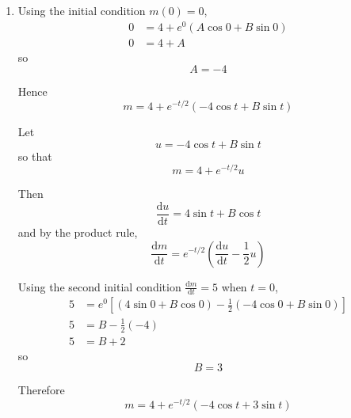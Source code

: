 \documentclass[leqno]{article}
\begin{document}
\begin{enumerate}[
  label=\textbf{\arabic*.},
  leftmargin=*,
  topsep=0pt,
  partopsep=0pt,
  parsep=0pt
]
\begin{tcolorbox}[colback=white, colframe=scarlet, title={\textbf{Solution}}, breakable, grow to left by=6mm, grow to right by=10mm]
\begin{enumerate}[label=\textbf{(\alph*)}]
  Its auxiliary equation is
  \[
  4\lambda^2+4\lambda+5=0
  \]

  Using the quadratic formula,
  \begin{align*}
  \lambda&=\frac{-4\pm\sqrt{4^2-4(4)(5)}}{2(4)}\\
  &=\frac{-4\pm\sqrt{16-80}}{8}\\
  &=\frac{-4\pm\sqrt{-64}}{8}\\
  &=\frac{-4\pm 8\mathrm{i}}{8}\\
  &=-\frac12\pm \mathrm{i}
  \end{align*}

  So the complementary function is
  \[
  m_c=e^{-t/2}(A\cos t+B\sin t)
  \]

  For a particular integral, try a constant value \(m=k\). Then
  \[
  \frac{\mathrm{d}m}{\mathrm{d}t}=0,\qquad \frac{\mathrm{d}^2m}{\mathrm{d}t^2}=0
  \]
  so substituting gives
  \[
  5k=20
  \]
  hence
  \[
  k=4
  \]

  Therefore the general solution is
  \[
  m=4+e^{-t/2}(A\cos t+B\sin t)
  \]

  \item Using the initial condition \(m(0)=0\),
  \begin{align*}
  0&=4+e^{0}(A\cos 0+B\sin 0)\\
  0&=4+A
  \end{align*}
  so
  \[
  A=-4
  \]

  Hence
  \[
  m=4+e^{-t/2}(-4\cos t+B\sin t)
  \]

  Let
  \[
  u=-4\cos t+B\sin t
  \]
  so that
  \[
  m=4+e^{-t/2}u
  \]

  Then
  \[
  \frac{\mathrm{d}u}{\mathrm{d}t}=4\sin t+B\cos t
  \]
  and by the product rule,
  \[
  \frac{\mathrm{d}m}{\mathrm{d}t}=e^{-t/2}\left(\frac{\mathrm{d}u}{\mathrm{d}t}-\frac12u\right)
  \]

  Using the second initial condition \(\frac{\mathrm{d}m}{\mathrm{d}t}=5\) when \(t=0\),
  \begin{align*}
  5&=e^{0}\left[\left(4\sin 0+B\cos 0\right)-\frac12\left(-4\cos 0+B\sin 0\right)\right]\\
  5&=B-\frac12(-4)\\
  5&=B+2
  \end{align*}
  so
  \[
  B=3
  \]

  Therefore
  \[
  m=4+e^{-t/2}(-4\cos t+3\sin t)
  \]


\end{enumerate}
\end{tcolorbox}
\end{enumerate}
\end{document}
